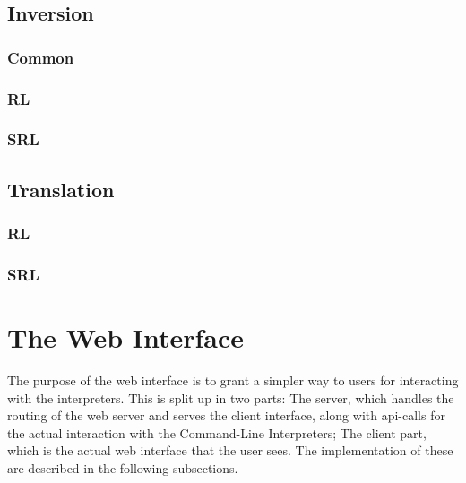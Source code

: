 \subsection*{Inversion}
%

\subsubsection*{Common}
%

\subsubsection*{RL}
%

\subsubsection*{SRL}
%

\subsection*{Translation}
%

\subsubsection*{RL}
%

\subsubsection*{SRL}
%




\section*{The Web Interface}
%

The purpose of the web interface is to grant a simpler way to users for interacting with the interpreters.
This is split up in two parts:
The server, which handles the routing of the web server and serves the client interface, along with api-calls for the actual interaction with the Command-Line Interpreters;
The client part, which is the actual web interface that the user sees.
The implementation of these are described in the following subsections.

